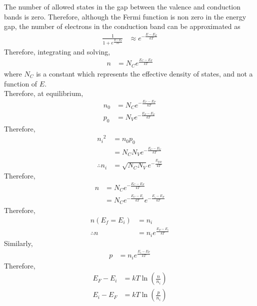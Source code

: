 \documentclass[titlepage, fleqn, a4paper, 12pt, twoside]{article}
\theoremstyle{definition}
\theoremstyle{theorem}
\begin{document}
The number of allowed states in the gap between the valence and conduction bands is zero.
Therefore, although the Fermi function is non zero in the energy gap, the number of electrons in the conduction band can be approximated as
\begin{align*}
	\frac{1}{1 + e^{\frac{E - E_F}{k T}}} & \approx e^{-\frac{E - E_F}{k T}}
\end{align*}
Therefore, integrating and solving,
\begin{align*}
	n & = N_C e^{\frac{E_C - E_F}{k T}}
\end{align*}
where $N_C$ is a constant which represents the effective density of states, and not a function of $E$.\\
Therefore, at equilibrium,
\begin{align*}
	n_0 & = N_C e^{-\frac{E_C - E_F}{k T}} \\
	p_0 & = N_V e^{-\frac{E_F - E_V}{k T}}
\end{align*}
Therefore,
\begin{align*}
	{n_i}^2        & = n_0 p_0                            \\
                       & = N_C N_V e^{-\frac{E_C - E_V}{k T}} \\
	\therefore n_i & = \sqrt{N_C N_V} e^{-\frac{E_{\text{gap}}}{k T}}
\end{align*}
Therefore,
\begin{align*}
	n & = N_C e^{-\frac{E_C - E_F}{k T}} \\
          & = N_C e^{-\frac{E_C - E_i}{k T}} e^{-\frac{E_i - E_F}{k T}}
\end{align*}
Therefore,
\begin{align*}
	n(E_f = E_i) & = n_i \\
	\therefore n & = n_i e^{\frac{E_F - E_i}{k T}}
\end{align*}
Similarly,
\begin{align*}
	p & = n_i e^{\frac{E_i - E_F}{k T}}
\end{align*}
Therefore,
\begin{align*}
	E_F - E_i & = k T \ln\left( \frac{n}{n_i} \right) \\
	E_i - E_F & = k T \ln\left( \frac{p}{n_i} \right)
\end{align*}
\end{document}
